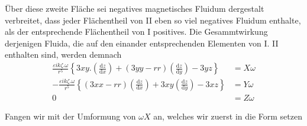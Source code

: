 Über diese zweite Fläche sei negatives magnetisches Fluidum dergestalt verbreitet, dass jeder Flächentheil von II eben so viel negatives Fluidum enthalte, als der entsprechende Flächentheil von I positives. Die Gesammtwirkung derjenigen Fluida, die auf den einander entsprechenden Elementen von I. II enthalten sind, werden demnach
\[
\begin{aligned}
\frac{\varepsilon ik\zeta.\omega}{r^5}\left\{3xy.\left(\frac{\mathrm dz}{\mathrm dx}\right)+(3yy-rr)\left(\frac{\mathrm dz}{\mathrm dy}\right)-3yz\right\}&=X\omega\\
-\frac{\varepsilon ik\zeta.\omega}{r^5}\left\{(3xx-rr)\left(\frac{\mathrm dz}{\mathrm dx}\right)+3xy\left(\frac{\mathrm dz}{\mathrm dy}\right)-3xz\right\}&=Y\omega\\
0&=Z\omega
\end{aligned}
\]

Fangen wir mit der Umformung von $\omega X$ an, welches wir zuerst in die Form setzen
